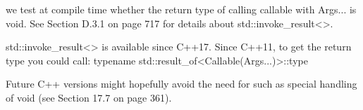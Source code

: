 \begin{itemize}
we test at compile time whether the return type of calling callable with Args... is void. See Section D.3.1 on page 717 for details about std::invoke\_result<>.

\begin{tcolorbox}[colback=webgreen!5!white,colframe=webgreen!75!black]
\hspace*{0.75cm}std::invoke\_result<> is available since C++17. Since C++11, to get the return type you could call: typename std::result\_of<Callable(Args...)>::type
\end{tcolorbox}

\end{itemize}

Future C++ versions might hopefully avoid the need for such as special handling of void (see Section 17.7 on page 361).












